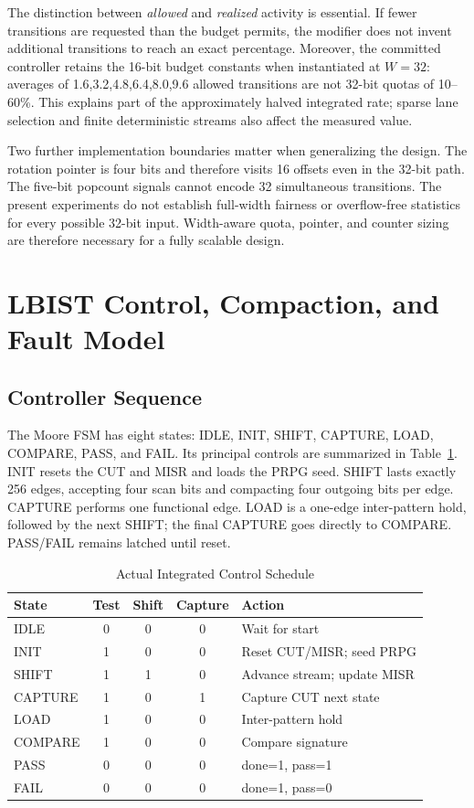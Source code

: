 \documentclass[conference,a4paper]{IEEEtran}
\begin{document}
The distinction between \emph{allowed} and \emph{realized} activity is essential.
If fewer transitions are requested than the budget permits, the modifier does
not invent additional transitions to reach an exact percentage. Moreover,
the committed controller retains the 16-bit budget constants when instantiated
at $W=32$: averages of 1.6,3.2,4.8,6.4,8.0,9.6 allowed transitions are not
32-bit quotas of 10--60\%. This explains part of the approximately halved
integrated rate; sparse lane selection and finite deterministic streams also
affect the measured value.

Two further implementation boundaries matter when generalizing the design.
The rotation pointer is four bits and therefore visits 16 offsets even in the
32-bit path. The five-bit popcount signals cannot encode 32 simultaneous
transitions. The present experiments do not establish full-width fairness or
overflow-free statistics for every possible 32-bit input. Width-aware quota,
pointer, and counter sizing are therefore necessary for a fully scalable design.

\section{LBIST Control, Compaction, and Fault Model}
\subsection{Controller Sequence}
The Moore FSM has eight states: IDLE, INIT, SHIFT, CAPTURE, LOAD, COMPARE,
PASS, and FAIL. Its principal controls are summarized in
Table~\ref{tab:fsm}. INIT resets the CUT and MISR and loads the PRPG seed.
SHIFT lasts exactly 256 edges, accepting four scan bits and compacting four
outgoing bits per edge. CAPTURE performs one functional edge. LOAD is a
one-edge inter-pattern hold, followed by the next SHIFT; the final CAPTURE
goes directly to COMPARE. PASS/FAIL remains latched until reset.

\begin{table}[!t]\caption{Actual Integrated Control Schedule}
\label{tab:fsm}\centering\small
\begin{tabular}{@{}lcccl@{}}\toprule
State & Test & Shift & Capture & Action \\\midrule
IDLE & 0 & 0 & 0 & Wait for start \\
INIT & 1 & 0 & 0 & Reset CUT/MISR; seed PRPG \\
SHIFT & 1 & 1 & 0 & Advance stream; update MISR \\
CAPTURE & 1 & 0 & 1 & Capture CUT next state \\
LOAD & 1 & 0 & 0 & Inter-pattern hold \\
COMPARE & 1 & 0 & 0 & Compare signature \\
PASS & 0 & 0 & 0 & done=1, pass=1 \\
FAIL & 0 & 0 & 0 & done=1, pass=0 \\\bottomrule
\end{tabular}
\end{table}
\end{document}
